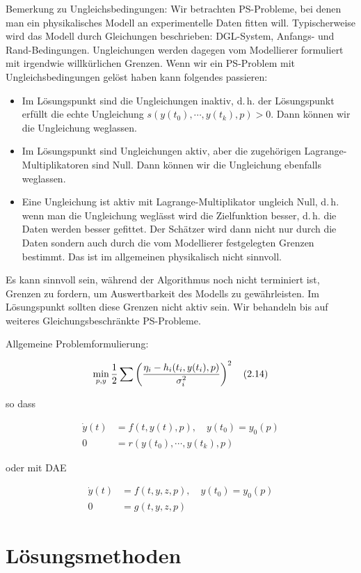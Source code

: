 Bemerkung zu Ungleichsbedingungen: Wir betrachten PS-Probleme, bei denen man ein physikalisches Modell an experimentelle Daten fitten will. Typischerweise wird das Modell durch Gleichungen beschrieben: DGL-System, Anfangs- und Rand-Bedingungen. Ungleichungen werden dagegen vom Modellierer formuliert mit irgendwie willkürlichen Grenzen. Wenn wir ein PS-Problem mit Ungleichsbedingungen gelöst haben kann folgendes passieren:

\begin{itemize}
\item Im Lösungspunkt sind die Ungleichungen inaktiv, d.\,h. der Lösungspunkt erfüllt die echte Ungleichung $s(y(t_0), \cdots, y(t_k), p) > 0$. Dann können wir die Ungleichung weglassen.
\item Im Lösungspunkt sind Ungleichungen aktiv, aber die zugehörigen Lagrange-Multiplikatoren sind Null. Dann können wir die Ungleichung ebenfalls weglassen.
\item Eine Ungleichung ist aktiv mit Lagrange-Multiplikator ungleich Null, d.\,h. wenn man die Ungleichung weglässt wird die Zielfunktion besser, d.\,h. die Daten werden besser gefittet. Der Schätzer wird dann nicht nur durch die Daten sondern auch durch die vom Modellierer festgelegten Grenzen bestimmt. Das ist im allgemeinen physikalisch nicht sinnvoll.
\end{itemize}

Es kann sinnvoll sein, während der Algorithmus noch nicht terminiert ist, Grenzen zu fordern, um Auswertbarkeit des Modells zu gewährleisten. Im Lösungspunkt sollten diese Grenzen nicht aktiv sein. Wir behandeln bis auf weiteres Gleichungsbeschränkte PS-Probleme.

Allgemeine Problemformulierung:

\[ \min_{p,y} \frac 12 \sum \left( \frac{\eta_i - h_i(t_i,y(t_i),p)}{\sigma_i^2} \right)^2 \quad (2.14)\]

so dass

\begin{align*}
\dot y(t) &= f(t,y(t),p), \quad y(t_0) = y_0(p) \\
0 &= r(y(t_0), \cdots, y(t_k), p)
\end{align*}

oder mit DAE

\begin{align*}
\dot y(t) &= f(t,y,z,p), \quad y(t_0) = y_0(p) \\
0 &= g(t,y,z,p) 
\end{align*}

\section*{Lösungsmethoden}

